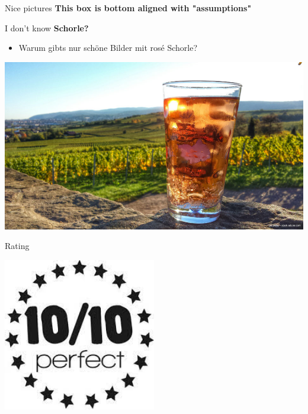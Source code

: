 \documentclass[
  a0paper,
  portrait,
  fontscale=.35 %
  ]{baposter}
\begin{document}
\begin{poster}
\begin{posterbox}[name=imgs,column=1,row=1, below=proof, bottomaligned=assumption]{Nice pictures}
	\textbf{This box is bottom aligned with "assumptions"}
\end{posterbox}

\begin{posterbox}[name=alc,column=2,row=1, below=intro]{I don't know}
	\textbf{Schorle?}
	\begin{itemize}
		\item Warum gibts nur schöne Bilder mit rosé Schorle?
	\end{itemize}
	\includegraphics[width=\textwidth]{imgs/schorle.jpg}
	\vspace{3cm}
\end{posterbox}

\begin{posterbox}[name=rating ,column=2,row=1, below=alc, bottomaligned=assumption]{Rating}
	\begin{center}
		\includegraphics[width=0.5\textwidth]{imgs/10_10.jpeg}
	\end{center}
\end{posterbox}


\end{poster}
\end{document}
